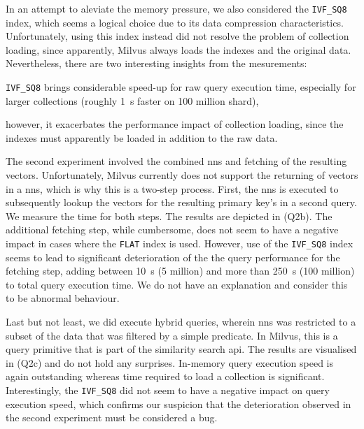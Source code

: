 In an attempt to aleviate the memory pressure, we also considered the \texttt{IVF\_SQ8} index, which seems a logical choice due to its data compression characteristics. Unfortunately, using this index instead did not resolve the problem of collection loading, since apparently, Milvus always loads the indexes and the original data. Nevertheless, there are two interesting insights from the mesurements:
\begin{enumerate*}[label=(\roman*)]
    \item \texttt{IVF\_SQ8} brings considerable speed-up for raw query execution time, especially for larger collections (roughly \SI{1}{\second} faster on 100 million shard),
    \item however, it exacerbates the performance impact of collection loading, since the indexes must apparently be loaded in addition to the raw data.
\end{enumerate*}

The second experiment involved the combined \acrshort{nns} and fetching of the resulting vectors. Unfortunately, Milvus currently does not support the returning of vectors in a \acrshort{nns}, which is why this is a two-step process. First, the \acrshort{nns} is executed to subsequently lookup the vectors for the resulting primary key's in a second query. We measure the time for both steps. The results are depicted in  (Q2b). The additional fetching step, while cumbersome, does not seem to have a negative impact in cases where the \texttt{FLAT} index is used. However, use of the \texttt{IVF\_SQ8} index seems to lead to significant deterioration of the the query performance for the fetching step, adding between \SI{10}{\second} (5 million) and more than \SI{250}{\second} (100 million) to total query execution time. We do not have an explanation and consider this to be abnormal behaviour.

Last but not least, we did execute hybrid queries, wherein \acrshort{nns} was restricted to a subset of the data that was filtered by a simple predicate. In Milvus, this is a query primitive that is part of the similarity search \acrshort{api}. The results are visualised in  (Q2c) and do not hold any surprises. In-memory query execution speed is again outstanding whereas time required to load a collection is significant. Interestingly, the \texttt{IVF\_SQ8} did not seem to have a negative impact on query execution speed, which confirms our suspicion that the deterioration observed in the second experiment must be considered a bug. 

